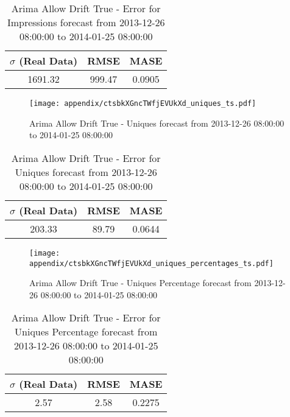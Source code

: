 \begin{table}[H]
\centering
\footnotesize
\begin{tabular}{ccc}
$\sigma$ (Real Data) & RMSE & MASE   \\ \hline
1691.32 & 999.47 & 0.0905 \\
\end{tabular}

\vspace{0.5cm}

\caption[]{
Arima Allow Drift True - Error for Impressions forecast from 2013-12-26 08:00:00 to 2014-01-25 08:00:00}
\end{table}

\begin{figure}[H] \begin{center} \leavevmode
\texttt{[image: appendix/ctsbkXGncTWfjEVUkXd\_uniques\_ts.pdf]} \caption[]{
Arima Allow Drift True - Uniques forecast from 2013-12-26 08:00:00 to 2014-01-25 08:00:00} \label{fig:appendix/ctsbkXGncTWfjEVUkXd_uniques_ts.pdf} \end{center}
\end{figure}

\begin{table}[H]
\centering
\footnotesize
\begin{tabular}{ccc}
$\sigma$ (Real Data) & RMSE & MASE   \\ \hline
203.33 & 89.79 & 0.0644 \\
\end{tabular}

\vspace{0.5cm}

\caption[]{
Arima Allow Drift True - Error for Uniques forecast from 2013-12-26 08:00:00 to 2014-01-25 08:00:00}
\end{table}

\begin{figure}[H] \begin{center} \leavevmode
\texttt{[image: appendix/ctsbkXGncTWfjEVUkXd\_uniques\_percentages\_ts.pdf]} \caption[]{
Arima Allow Drift True - Uniques Percentage forecast from 2013-12-26 08:00:00 to 2014-01-25 08:00:00} \label{fig:appendix/ctsbkXGncTWfjEVUkXd_uniques_percentages_ts.pdf} \end{center}
\end{figure}

\begin{table}[H]
\centering
\footnotesize
\begin{tabular}{ccc}
$\sigma$ (Real Data) & RMSE & MASE   \\ \hline
2.57 & 2.58 & 0.2275 \\
\end{tabular}

\vspace{0.5cm}

\caption[]{
Arima Allow Drift True - Error for Uniques Percentage forecast from 2013-12-26 08:00:00 to 2014-01-25 08:00:00}
\end{table}

